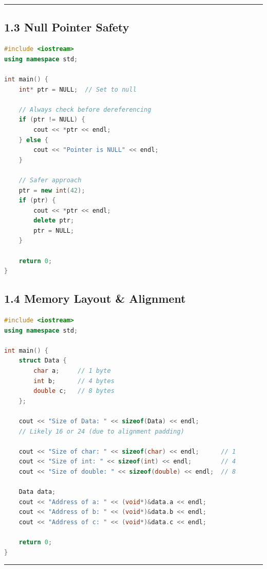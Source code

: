 \begin{center}\rule{0.5\linewidth}{0.5pt}\end{center}

\hypertarget{null-pointer-safety}{%
\subsection{1.3 Null Pointer Safety}\label{null-pointer-safety}}

\begin{lstlisting}[language={C++}]
#include <iostream>
using namespace std;

int main() {
    int* ptr = NULL;  // Set to null

    // Always check before dereferencing
    if (ptr != NULL) {
        cout << *ptr << endl;
    } else {
        cout << "Pointer is NULL" << endl;
    }

    // Safer approach
    ptr = new int(42);
    if (ptr) {
        cout << *ptr << endl;
        delete ptr;
        ptr = NULL;
    }

    return 0;
}
\end{lstlisting}

\hypertarget{memory-layout-alignment}{%
\subsection{1.4 Memory Layout \&
Alignment}\label{memory-layout-alignment}}

\begin{lstlisting}[language={C++}]
#include <iostream>
using namespace std;

int main() {
    struct Data {
        char a;     // 1 byte
        int b;      // 4 bytes
        double c;   // 8 bytes
    };

    cout << "Size of Data: " << sizeof(Data) << endl;
    // Likely 16 or 24 (due to alignment padding)

    cout << "Size of char: " << sizeof(char) << endl;      // 1
    cout << "Size of int: " << sizeof(int) << endl;        // 4
    cout << "Size of double: " << sizeof(double) << endl;  // 8

    Data data;
    cout << "Address of a: " << (void*)&data.a << endl;
    cout << "Address of b: " << (void*)&data.b << endl;
    cout << "Address of c: " << (void*)&data.c << endl;

    return 0;
}
\end{lstlisting}

\begin{center}\rule{0.5\linewidth}{0.5pt}\end{center}

